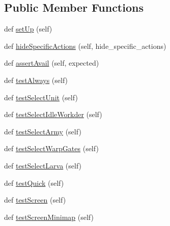 \subsection*{Public Member Functions}
\begin{DoxyCompactItemize}
\item 
def \mbox{\hyperlink{classpysc2_1_1lib_1_1features__test_1_1_available_actions_test_a085183352ca922ab9a9c064bf97c2a29}{set\+Up}} (self)
\item 
def \mbox{\hyperlink{classpysc2_1_1lib_1_1features__test_1_1_available_actions_test_a1c9bfef603273fcfbdf206f7a0ef7620}{hide\+Specific\+Actions}} (self, hide\+\_\+specific\+\_\+actions)
\item 
def \mbox{\hyperlink{classpysc2_1_1lib_1_1features__test_1_1_available_actions_test_af4d9c7bad6bec5202f096d73cfc641b3}{assert\+Avail}} (self, expected)
\item 
def \mbox{\hyperlink{classpysc2_1_1lib_1_1features__test_1_1_available_actions_test_a2a9f056fe14cf0acb0bc47e4e1be6c61}{test\+Always}} (self)
\item 
def \mbox{\hyperlink{classpysc2_1_1lib_1_1features__test_1_1_available_actions_test_a5e280b23d7546871414c4eb0beced74b}{test\+Select\+Unit}} (self)
\item 
def \mbox{\hyperlink{classpysc2_1_1lib_1_1features__test_1_1_available_actions_test_ab667d51eb6a9b38da9ac0ababe007daf}{test\+Select\+Idle\+Workder}} (self)
\item 
def \mbox{\hyperlink{classpysc2_1_1lib_1_1features__test_1_1_available_actions_test_a0c4201958e89dce9568dc9f2d778ae5a}{test\+Select\+Army}} (self)
\item 
def \mbox{\hyperlink{classpysc2_1_1lib_1_1features__test_1_1_available_actions_test_afc40ca9b4dfc4f1386afff0dff62c85c}{test\+Select\+Warp\+Gates}} (self)
\item 
def \mbox{\hyperlink{classpysc2_1_1lib_1_1features__test_1_1_available_actions_test_af14c6e97325e81deefa0a4e2dca95ee6}{test\+Select\+Larva}} (self)
\item 
def \mbox{\hyperlink{classpysc2_1_1lib_1_1features__test_1_1_available_actions_test_a5daf15a6ed60b693b5af58dc78942297}{test\+Quick}} (self)
\item 
def \mbox{\hyperlink{classpysc2_1_1lib_1_1features__test_1_1_available_actions_test_a04b287433102571ee2a0d2fe8f092957}{test\+Screen}} (self)
\item 
def \mbox{\hyperlink{classpysc2_1_1lib_1_1features__test_1_1_available_actions_test_abb7f4f31b32926091d499c71d49f2c5d}{test\+Screen\+Minimap}} (self)

\end{DoxyCompactItemize}
